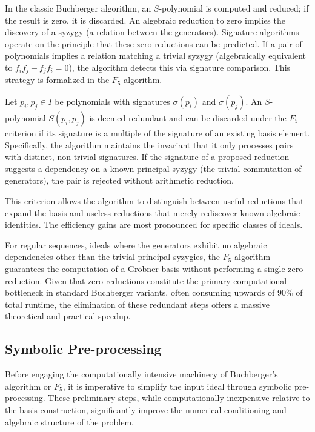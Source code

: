 In the classic Buchberger algorithm, an $S$-polynomial is computed and reduced; if the result is zero, it is discarded. An algebraic reduction to zero implies the discovery of a syzygy (a relation between the generators). Signature algorithms operate on the principle that these zero reductions can be predicted. If a pair of polynomials implies a relation matching a trivial syzygy (algebraically equivalent to $f_i f_j - f_j f_i = 0$), the algorithm detects this via signature comparison. This strategy is formalized in the $F_5$ algorithm.

\begin{definition}[$F_5$ Criterion]
    Let $p_i, p_j \in I$ be polynomials with signatures $\sigma(p_i)$ and $\sigma(p_j)$. An $S$-polynomial $S(p_i, p_j)$ is deemed redundant and can be discarded under the $F_5$ criterion if its signature is a multiple of the signature of an existing basis element. Specifically, the algorithm maintains the invariant that it only processes pairs with distinct, non-trivial signatures. If the signature of a proposed reduction suggests a dependency on a known principal syzygy (the trivial commutation of generators), the pair is rejected without arithmetic reduction.
\end{definition}

This criterion allows the algorithm to distinguish between useful reductions that expand the basis and useless reductions that merely rediscover known algebraic identities. The efficiency gains are most pronounced for specific classes of ideals.

For regular sequences, ideals where the generators exhibit no algebraic dependencies other than the trivial principal syzygies, the $F_5$ algorithm guarantees the computation of a Gröbner basis without performing a single zero reduction. Given that zero reductions constitute the primary computational bottleneck in standard Buchberger variants, often consuming upwards of 90\% of total runtime, the elimination of these redundant steps offers a massive theoretical and practical speedup.

\subsection{Symbolic Pre-processing}
\label{subsec:symbolic_preprocessing}

Before engaging the computationally intensive machinery of Buchberger's algorithm or $F_5$, it is imperative to simplify the input ideal through symbolic pre-processing. These preliminary steps, while computationally inexpensive relative to the basis construction, significantly improve the numerical conditioning and algebraic structure of the problem.

